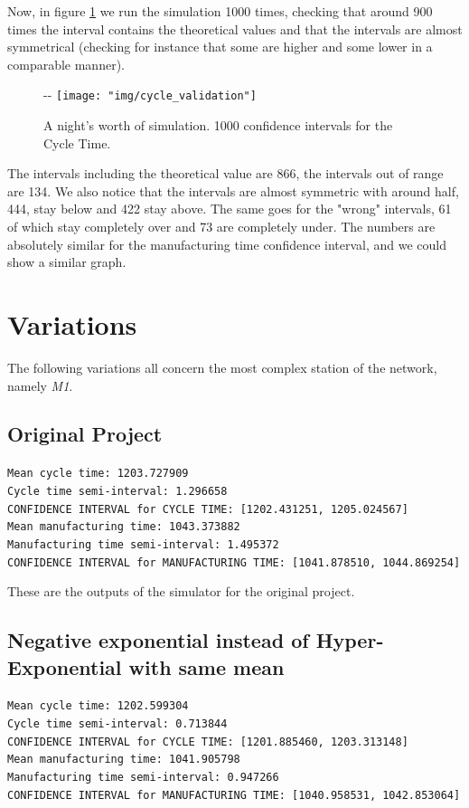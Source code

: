 \documentclass[paper=a4, fontsize=11pt]{scrartcl}
\numberwithin{equation}{section}		%
\numberwithin{figure}{section}			%
\numberwithin{table}{section}				%
\begin{document}
Now, in figure \ref{fig:cycle_validation} we run the simulation 1000 times, checking that around 900 times the interval contains the theoretical values and that the intervals are almost symmetrical (checking for instance that some are higher and some lower in a comparable manner).
\begin{figure}
	\begin{adjustwidth}{-\oddsidemargin-0.5in}{-\rightmargin}
     		\centering
		\texttt{[image: "img/cycle\_validation"]}
		\caption{A night's worth of simulation. 1000 confidence intervals for the Cycle Time.}
		\label{fig:cycle_validation}
		\end{adjustwidth}
\end{figure}
The intervals including the theoretical value are 866, the intervals out of range are 134. We also notice that the intervals are almost symmetric with around half, 444, stay below and 422 stay above. The same goes for the "wrong" intervals, 61 of which stay completely over and 73 are completely under.
The numbers are absolutely similar for the manufacturing time confidence interval, and we could show a similar graph.

\section{Variations}
The following variations all concern the most complex station of the network, namely \textit{M1}.

\subsection{Original Project}
\texttt{Mean cycle time: 1203.727909\\
Cycle time semi-interval: 1.296658\\
CONFIDENCE INTERVAL for CYCLE TIME: [1202.431251, 1205.024567]\\
Mean manufacturing time: 1043.373882\\
Manufacturing time semi-interval: 1.495372\\
CONFIDENCE INTERVAL for MANUFACTURING TIME: [1041.878510, 1044.869254]}

These are the outputs of the simulator for the original project.

\subsection{Negative exponential instead of Hyper-Exponential with same mean} \label{subsec:proj2}
\texttt{Mean cycle time: 1202.599304\\
Cycle time semi-interval: 0.713844\\
CONFIDENCE INTERVAL for CYCLE TIME: [1201.885460, 1203.313148]\\
Mean manufacturing time: 1041.905798\\
Manufacturing time semi-interval: 0.947266\\
CONFIDENCE INTERVAL for MANUFACTURING TIME: [1040.958531, 1042.853064]}\\
\end{document}
